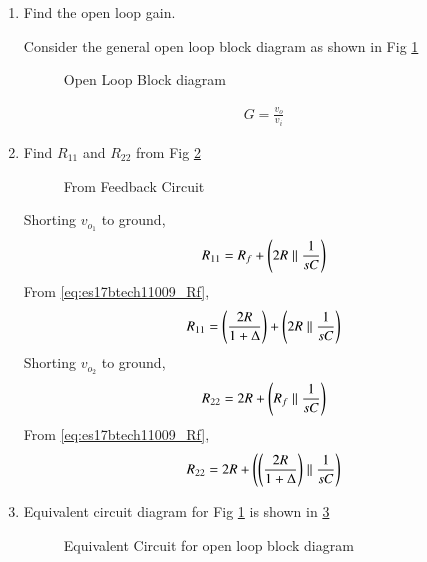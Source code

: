 \begin{enumerate}[label=\arabic*.,ref=\theenumi]
\item
Find the open loop gain.

Consider the general open loop block diagram as shown in Fig \ref{fig:es17btech11009_block1}
\renewcommand{\thefigure}{\theenumi.\arabic{figure}}
\begin{figure}[!ht]
	\begin{center}
		\resizebox{\columnwidth}{!}{}
	\end{center}
\caption{Open Loop Block diagram}
\label{fig:es17btech11009_block1}
\end{figure}
\begin{align}
    G = \frac{v_{o}}{v_{i}} 
\end{align}
\item
Find $R_{11}$ and $R_{22}$ from Fig \ref{fig:es17btech11009_R}
\renewcommand{\thefigure}{\theenumi.\arabic{figure}}
\begin{figure}[!ht]
	\begin{center}
		\resizebox{\columnwidth}{!}{}
	\end{center}
\caption{From Feedback Circuit}
\label{fig:es17btech11009_R}
\end{figure}

Shorting $v_{o_1}$ to ground,
\begin{align}
    R_{11} = R_{f} + \left(2R\parallel \frac{1}{sC}\right)
\end{align}
From \eqref{eq:es17btech11009_Rf},
\begin{align}
    R_{11} = \left(\frac{2R}{1+ \Delta}\right) + \left(2R \parallel \frac{1}{sC}\right)
\end{align}
Shorting $v_{o_2}$ to ground,
\begin{align}
    R_{22} = 2R + \left(R_{f}\parallel \frac{1}{sC}\right)
\end{align}
From \eqref{eq:es17btech11009_Rf},
\begin{align}
    R_{22} =  2R + \left(\left(\frac{2R}{1 + \Delta}\right)\parallel \frac{1}{sC}\right)
\end{align}

\item
Equivalent circuit diagram for Fig \ref{fig:es17btech11009_block1} is shown in \ref{fig:es17btech11009_block2}
\renewcommand{\thefigure}{\theenumi.\arabic{figure}}
\begin{figure}[!ht]
	\begin{center}
		\resizebox{\columnwidth}{!}{}
	\end{center}
\caption{Equivalent Circuit for open loop block diagram}
\label{fig:es17btech11009_block2}
\end{figure}


\end{enumerate}
